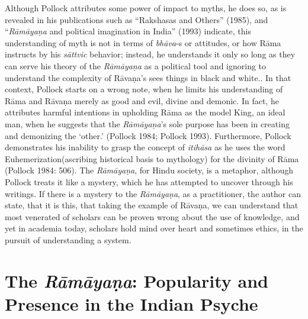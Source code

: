 {Although Pollock attributes some power of impact to myths, he does so, as is revealed in his publications such as “Rakshasas and Others” (1985), and “\textit{Rāmāyaṇa} and political imagination in India” (1993) indicate, this understanding of myth is not in terms of \textit{bhāva}-s or attitudes, or how Rāma instructs by his \textit{sāttvic} behavior; instead, he understands it only so long as they can serve his theory of the \textit{Rāmāyaṇa} as a political tool and ignoring to understand the complexity of Rāvaṇa’s sees things in black and white.}. In that context, Pollock starts on a wrong note, when he limits his understanding of Rāma and Rāvaṇa merely as good and evil, divine and demonic. In fact, he attributes harmful intentions in upholding Rāma as the model King, an ideal man, when he suggests that the \textit{Rāmāyaṇa}’s sole purpose has been in creating and demonizing the ‘other.’ (Pollock 1984; Pollock 1993). Furthermore, Pollock demonstrates his inability to grasp the concept of \textit{itihāsa} as he uses the word Euhemerization(ascribing historical basis to mythology) for the divinity of Rāma (Pollock 1984: 506). The \textit{Rāmāyaṇa}, for Hindu society, is a metaphor, although Pollock treats it like a mystery, which he has attempted to uncover through his writings. If there is a mystery to the \textit{Rāmāyaṇa}, as a practitioner, the author can state, that it is this, that taking the example of Rāvaṇa, we can understand that most venerated of scholars can be proven wrong about the use of knowledge, and yet in academia today, scholars hold mind over heart and sometimes ethics, in the pursuit of understanding a system.


\section*{The \textit{Rāmāyaṇa}: Popularity and Presence in the Indian Psyche}

